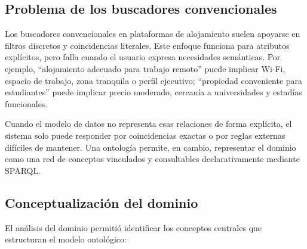 \subsection{Problema de los buscadores convencionales}

Los buscadores convencionales en plataformas de alojamiento suelen apoyarse en filtros
discretos y coincidencias literales. Este enfoque funciona para atributos explícitos,
pero falla cuando el usuario expresa necesidades semánticas. Por ejemplo, ``alojamiento
adecuado para trabajo remoto'' puede implicar Wi-Fi, espacio de trabajo, zona tranquila
o perfil ejecutivo; ``propiedad conveniente para estudiantes'' puede implicar precio
moderado, cercanía a universidades y estadías funcionales.

Cuando el modelo de datos no representa esas relaciones de forma explícita, el sistema
solo puede responder por coincidencias exactas o por reglas externas difíciles de
mantener. Una ontología permite, en cambio, representar el dominio como una red de
conceptos vinculados y consultables declarativamente mediante SPARQL.

\subsection{Conceptualización del dominio}

El análisis del dominio permitió identificar los conceptos centrales que estructuran el
modelo ontológico:

